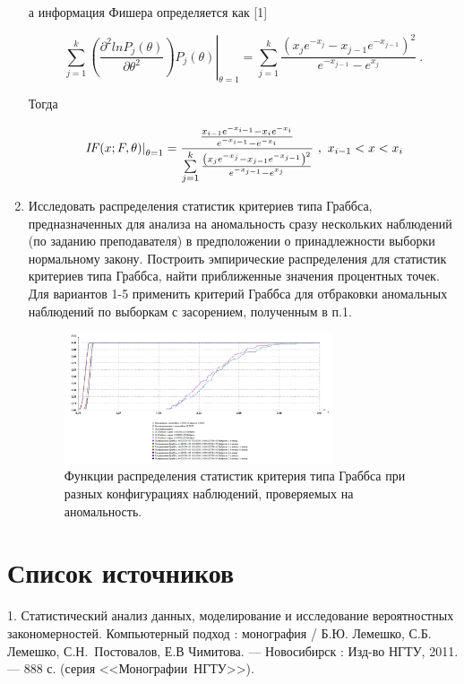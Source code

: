 \documentclass[a4paper,12pt]{article}
\begin{document}
\begin{enumerate}
а информация Фишера определяется как [1]

\begin{equation}
	\left.
	\sum\limits_{j=1}^{k}
		\left(
			\frac
				{ \partial^2 lnP_j(\theta) }
				{ \partial \theta^2 }
		\right)
	P_j(\theta) \right|_{\theta=1}
	=
	\sum\limits_{j=1}^{k}
	\frac
	{ \left( x_j e^{-x_j} - x_{j-1} e^{-x_{j-1}} \right)^2 }
	{ e^{-x_{j-1}} - e^{x_j} } \ .
\end{equation}

Тогда

\begin{equation}
	\left.\mbox{\emph{IF}}(x; F, \theta)\right\rvert_{\theta=1} = 
	\frac
	{
		\frac
		{ x_{i-1} e^{-x_{i-1}} - x_i e^{-x_i} }
		{ e^{-x_{i-1}} - e^{-x_i} } 
	}
	{
		\sum\limits_{j=1}^{k}
		\frac
		{ \left( x_j e^{-x_j} - x_{j-1} e^{-x_{j-1}} \right)^2 }
		{ e^{-x_{j-1}} - e^{x_j} }
	} \ , \ x_{i-1} < x < x_i
\end{equation}

\item Исследовать распределения статистик критериев типа Граббса,
предназначенных для анализа на аномальность сразу нескольких наблюдений
(по заданию преподавателя) в предположении о принадлежности выборки
нормальному закону. Построить эмпирические распределения для статистик
критериев типа Граббса, найти приближенные значения процентных точек. Для
вариантов 1-5 применить критерий Граббса для отбраковки аномальных
наблюдений по выборкам с засорением, полученным в п.1.

\begin{figure}[H]
\centering
\includegraphics[width=0.75\textwidth]{grabbs}
\caption{Функции распределения статистик критерия типа Граббса при разных
	конфигурациях наблюдений, проверяемых на аномальность.}
\end{figure}

\end{enumerate}



\section*{Список источников}


1. Статистический анализ данных, моделирование и исследование вероятностных
закономерностей. Компьютерный подход : монография / Б.Ю. Лемешко, С.Б. Лемешко,
\mbox{С.Н. Постовалов}, Е.В Чимитова. --- Новосибирск : Изд-во НГТУ, 2011. --- 888 с.
(серия <<\mbox{Монографии НГТУ}>>).
\end{document}

